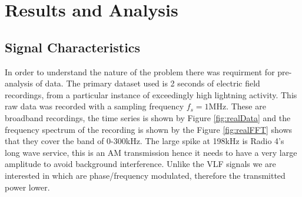 \chapter{Results and Analysis}
\section{Signal Characteristics}\label{sec:sigChar}
In order to understand the nature of the problem there was requirment for pre-analysis of data. The primary dataset used is 2 seconds of electric field recordings, from a particular instance of exceedingly high lightning activity. This raw data was recorded with a sampling frequency $f_s = 1\si{\mega\hertz}$. These are broadband recordings, the time series is shown by Figure \ref{fig:realData} and the frequency spectrum of the recording is shown by the Figure \ref{fig:realFFT} shows that they cover the band of 0-300\si{\kilo\hertz}. The large spike at 198kHz is Radio 4's long wave service, this is an AM transmission hence it needs to have a very large amplitude to avoid background interference. Unlike the VLF signals we are interested in which are phase/frequency modulated, therefore the transmitted power lower.


